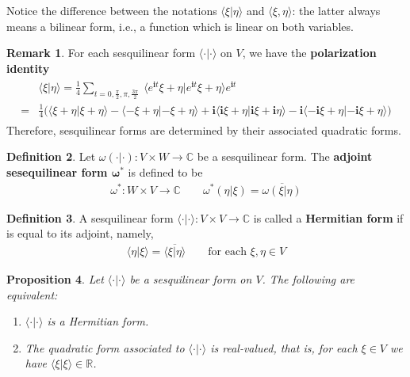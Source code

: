 \documentclass[12pt,b5paper,notitlepage]{article}
\theoremstyle{definition}
\newtheorem{df}{Definition}[subsection]
\newtheorem{rem}[df]{Remark}
\theoremstyle{plain}
\newtheorem{pp}[df]{Proposition}
\newcommand{\ovl}{\overline}
\newcommand{\bk}[1]{\langle {#1}\rangle}
\newcommand{\im}{\mathbf{i}}
\newcommand{\Cbb}{\mathbb C}
\newcommand{\Rbb}{\mathbb R}
\numberwithin{equation}{section}
\begin{document}
Notice the difference between the notations $\bk{\xi|\eta}$ and $\bk{\xi,\eta}$: the latter always means a bilinear form, i.e., a function which is linear on both variables.


\begin{rem}\label{lb237}
For each sesquilinear form $\bk{\cdot|\cdot}$ on $V$, we have the \textbf{polarization identity} 
\begin{align}\label{eq134}
\begin{aligned}
&\bk{\xi|\eta}=\frac 14\sum_{t=0,\frac \pi 2,\pi,\frac{3\pi}2}~ \bk{e^{\im t}\xi+\eta|e^{\im t}\xi+\eta}e^{\im t}\\
=&\frac 14\Big(\bk{\xi+\eta|\xi+\eta}-\bk{-\xi+\eta|-\xi+\eta}+\im\bk{\im \xi+\eta|\im \xi+\im \eta}-\im\bk{-\im \xi+\eta|-\im \xi+\eta}\Big)
\end{aligned}
\end{align}
Therefore, sesquilinear forms are determined by their associated quadratic forms.
\end{rem}



\begin{df}
Let $\omega(\cdot|\cdot):V\times W\rightarrow\Cbb$ be a sesquilinear form. The \textbf{adjoint sesequilinear form $\pmb{\omega^*}$}   is defined to be
\begin{align*}
\omega^*:W\times V\rightarrow\Cbb\qquad \omega^*(\eta|\xi)=\ovl{\omega(\xi|\eta)}
\end{align*}
\end{df}


\begin{df}
A sesquilinear form $\bk{\cdot|\cdot}:V\times V\rightarrow\Cbb$ is called a \textbf{Hermitian form}  if is equal to its adjoint, namely, 
\begin{align*}
\bk{\eta|\xi}=\ovl{\bk{\xi|\eta}}\qquad\text{for each }\xi,\eta\in V
\end{align*}
\end{df}



\begin{pp}\label{lb113}
Let $\bk{\cdot|\cdot}$ be a sesquilinear form on $V$. The following are equivalent:
\begin{enumerate}[label=(\arabic*)]
\item $\bk{\cdot|\cdot}$ is a Hermitian form.
\item The quadratic form associated to $\bk{\cdot|\cdot}$ is real-valued, that is, for each $\xi\in V$ we have $\bk{\xi|\xi}\in\Rbb$.
\end{enumerate}
\end{pp}
\end{document}
